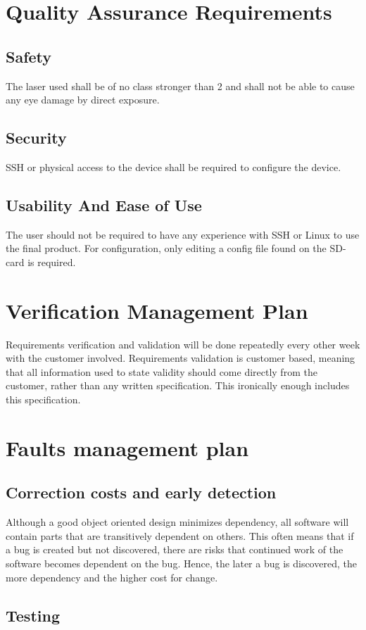 \documentclass{article}
\begin{document}
\section{Quality Assurance Requirements}
\subsection{Safety}
The laser used shall be of no class stronger than 2 and shall not be able to cause any eye damage by direct exposure.
\subsection{Security}
SSH or physical access to the device shall be required to configure the device.
\subsection{Usability And Ease of Use}
The user should not be required to have any experience with SSH or Linux to use the final product.
For configuration, only editing a config file found on the SD-card is required.

\section{Verification Management Plan}
Requirements verification and validation will be done repeatedly every other week with the customer involved.
Requirements validation is customer based, meaning that all information used to state validity should come directly from the customer, rather than any written specification.
This ironically enough includes this specification.

\section{Faults management plan}
\subsection{Correction costs and early detection}
Although a good object oriented design minimizes dependency, all software will contain parts that are transitively dependent on others.
This often means that if a bug is created but not discovered, there are risks that continued work of the software becomes dependent on the bug.
Hence, the later a bug is discovered, the more dependency and the higher cost for change.
\subsection{Testing}
\end{document}
